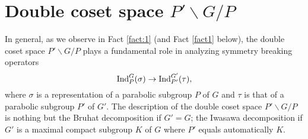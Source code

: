 \documentclass[reqno,12pt]{pja00} %
\newcommand{\Ind}{\mbox{\normalfont Ind}}
\theoremstyle{definition}
\theoremstyle{exampstyle} \newtheorem{examp}[theorem]{Theorem}
\begin{document}
\section{Double coset space $P'\backslash G/P$}
In general, as we observe in Fact \ref{fact:1} (and Fact \ref{fact1} below), the double coset space $P'\backslash G/P$ plays a fundamental role in analyzing symmetry breaking operators\begin{equation*}
	\Ind_P^G(\sigma)\to\Ind_{P'}^{G'}(\tau),
\end{equation*}where $\sigma$ is a representation of a parabolic subgroup $P$ of $G$ 
and $\tau$ is that of a parabolic subgroup $P'$ of $G'$. The description of the double coset space $P'\backslash G/P$
is nothing but the Bruhat decomposition if $G'=G$; 
the Iwasawa decomposition if $G'$ is a maximal compact subgroup $K$ of $G$ 
where $P'$ equals automatically  $K$. 
\end{document}
